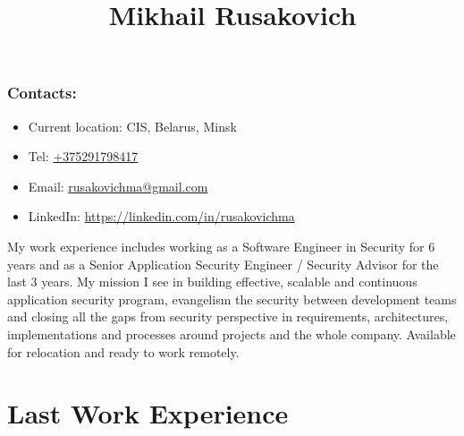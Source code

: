 \documentclass[a4paper, 12pt]{article}
\title{Mikhail Rusakovich}
\author{}
\date{}
\begin{document}
\maketitle

\subsubsection*{Contacts:}
\begin{itemize}
	\item Current location: CIS, Belarus, Minsk
    \item Tel: \href{tel:+375291798417}{+375291798417}
    \item Email: \href{mailto:rusakovichma@gmail.com}{rusakovichma@gmail.com}
    \item LinkedIn: \href{https://linkedin.com/in/rusakovichma
}{https://linkedin.com/in/rusakovichma}
\end{itemize}

My work experience includes working as a Software Engineer in Security for 6 years and as a Senior Application Security Engineer / Security Advisor for the last 3 years. 
\newline
\newline
My mission I see in building effective, scalable and continuous application security program, evangelism the security between development teams and closing all the gaps from security perspective in requirements, architectures, implementations and processes around projects and the whole company.
\newline
\newline
Available for relocation and ready to work remotely.


\section*{Last Work Experience}
\end{document}
